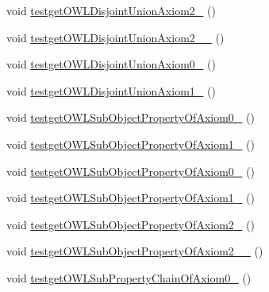 \begin{DoxyCompactItemize}
\item 
void \hyperlink{classorg_1_1semanticweb_1_1owlapi_1_1api_1_1test_1_1_null_check_test_case_a95bdca8a6af89caefb410b5a9c81ead3}{testget\-O\-W\-L\-Disjoint\-Union\-Axiom2\-\_} ()
\item 
void \hyperlink{classorg_1_1semanticweb_1_1owlapi_1_1api_1_1test_1_1_null_check_test_case_a7f22db359f228de5e9b7770c35e71184}{testget\-O\-W\-L\-Disjoint\-Union\-Axiom2\-\_\-\_} ()
\item 
void \hyperlink{classorg_1_1semanticweb_1_1owlapi_1_1api_1_1test_1_1_null_check_test_case_a135e1070ba56fb4938c8484cdbfefe18}{testget\-O\-W\-L\-Disjoint\-Union\-Axiom0\-\_} ()
\item 
void \hyperlink{classorg_1_1semanticweb_1_1owlapi_1_1api_1_1test_1_1_null_check_test_case_a26ccc80588bec49d50dfaba413ca260d}{testget\-O\-W\-L\-Disjoint\-Union\-Axiom1\-\_} ()
\item 
void \hyperlink{classorg_1_1semanticweb_1_1owlapi_1_1api_1_1test_1_1_null_check_test_case_a7b7dbadce01fe4f961f2eb920aa375c6}{testget\-O\-W\-L\-Sub\-Object\-Property\-Of\-Axiom0\-\_} ()
\item 
void \hyperlink{classorg_1_1semanticweb_1_1owlapi_1_1api_1_1test_1_1_null_check_test_case_a7c916fdb640660979cb0aac621258a7b}{testget\-O\-W\-L\-Sub\-Object\-Property\-Of\-Axiom1\-\_} ()
\item 
void \hyperlink{classorg_1_1semanticweb_1_1owlapi_1_1api_1_1test_1_1_null_check_test_case_a98660cfd3623257f259ede7cbaf57285}{testget\-O\-W\-L\-Sub\-Object\-Property\-Of\-Axiom0\-\_} ()
\item 
void \hyperlink{classorg_1_1semanticweb_1_1owlapi_1_1api_1_1test_1_1_null_check_test_case_a244f1930f6303dbd549293ddcb81f9e5}{testget\-O\-W\-L\-Sub\-Object\-Property\-Of\-Axiom1\-\_} ()
\item 
void \hyperlink{classorg_1_1semanticweb_1_1owlapi_1_1api_1_1test_1_1_null_check_test_case_aae541d3d8d3b158ea78bc15feed09ea6}{testget\-O\-W\-L\-Sub\-Object\-Property\-Of\-Axiom2\-\_} ()
\item 
void \hyperlink{classorg_1_1semanticweb_1_1owlapi_1_1api_1_1test_1_1_null_check_test_case_a72a01e72118716841bf95e127ed19640}{testget\-O\-W\-L\-Sub\-Object\-Property\-Of\-Axiom2\-\_\-\_} ()
\item 
void \hyperlink{classorg_1_1semanticweb_1_1owlapi_1_1api_1_1test_1_1_null_check_test_case_a192cf519c4157dd09a40ee235529ba01}{testget\-O\-W\-L\-Sub\-Property\-Chain\-Of\-Axiom0\-\_} ()
\item 

\end{DoxyCompactItemize}
